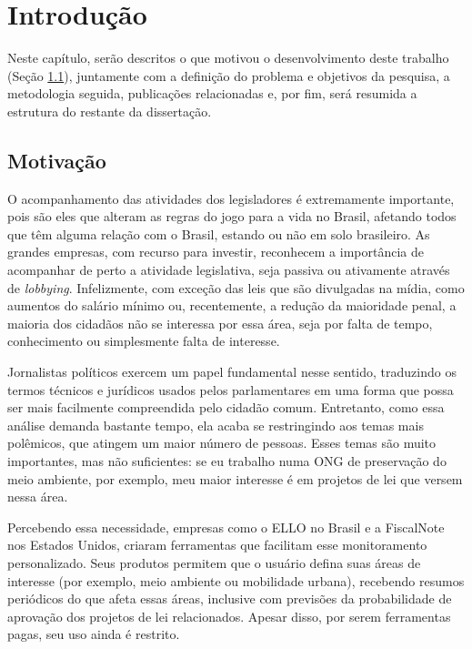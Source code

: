 \chapter{Introdução} \label{intro}

Neste capítulo, serão descritos o que motivou o desenvolvimento deste trabalho
(Seção \ref{sec:motivacao}), juntamente com a definição do problema e objetivos
da pesquisa, a metodologia seguida, publicações relacionadas e, por fim, será
resumida a estrutura do restante da dissertação.

\section{Motivação}\label{sec:motivacao}

O acompanhamento das atividades dos legisladores é extremamente importante,
pois são eles que alteram as regras do jogo para a vida no Brasil, afetando
todos que têm alguma relação com o Brasil, estando ou não em solo brasileiro.
As grandes empresas, com recurso para investir, reconhecem a importância de
acompanhar de perto a atividade legislativa, seja passiva ou ativamente através
de \emph{lobbying}. Infelizmente, com exceção das leis que são divulgadas na
mídia, como aumentos do salário mínimo ou, recentemente, a redução da
maioridade penal, a maioria dos cidadãos não se interessa por essa área, seja
por falta de tempo, conhecimento ou simplesmente falta de interesse.

Jornalistas políticos exercem um papel fundamental nesse sentido, traduzindo os
termos técnicos e jurídicos usados pelos parlamentares em uma forma que possa
ser mais facilmente compreendida pelo cidadão comum. Entretanto, como essa
análise demanda bastante tempo, ela acaba se restringindo aos temas mais
polêmicos, que atingem um maior número de pessoas. Esses temas são muito
importantes, mas não suficientes: se eu trabalho numa ONG de preservação do
meio ambiente, por exemplo, meu maior interesse é em projetos de lei que versem
nessa área.

Percebendo essa necessidade, empresas como o \gls{ELLO} no Brasil e a
FiscalNote nos Estados Unidos, criaram ferramentas que facilitam esse
monitoramento personalizado. Seus produtos permitem que o usuário defina suas
áreas de interesse (por exemplo, meio ambiente ou mobilidade urbana),
recebendo resumos periódicos do que afeta essas áreas, inclusive com previsões
da probabilidade de aprovação dos projetos de lei relacionados. Apesar disso,
por serem ferramentas pagas, seu uso ainda é restrito.


